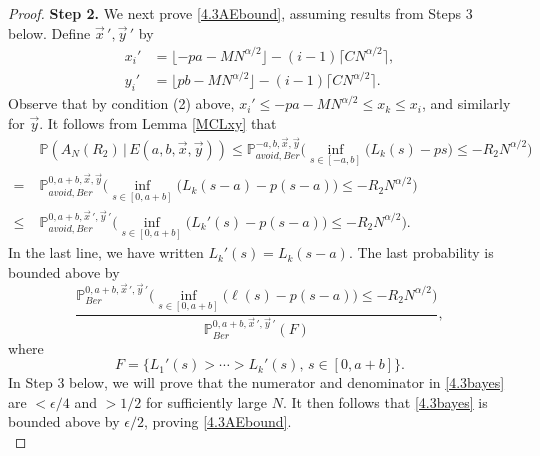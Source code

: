 \begin{proof}
		\noindent\textbf{Step 2.} We next prove \eqref{4.3AEbound}, assuming results from Steps 3 below. Define $\vec{x}\,',\vec{y}\,'$ by
		\begin{align*}
		x_i' &= \lfloor - pa - MN^{\alpha/2}\rfloor - (i-1)\lceil CN^{\alpha/2}\rceil,\\
		y_i' &= \lfloor pb - MN^{\alpha/2}\rfloor - (i-1)\lceil CN^{\alpha/2}\rceil.
		\end{align*}  
		Observe that by condition (2) above, $x_i'\leq -pa - MN^{\alpha/2} \leq x_k \leq x_i$, and similarly for $\vec{y}$. It follows from Lemma \ref{MCLxy} that
		\begin{align}
		&\mathbb{P}(A_N(R_2)\,|\,E(a,b,\vec{x},\vec{y})) \leq \mathbb{P}^{-a,b, \vec{x}, \vec{y}}_{avoid, Ber} \Big( \inf_{s\in[-a, b]} \big(L_k(s) - ps\big) \leq -R_2N^{\alpha/2} \Big) \label{4.3main}\\
		= \; & \mathbb{P}^{0, a+b, \vec{x}, \vec{y}}_{avoid, Ber} \Big( \inf_{s\in[0,a+b]} \big(L_k(s-a) - p(s-a)\big) \leq -R_2N^{\alpha/2} \Big) \nonumber\\
		\leq \; & \mathbb{P}^{0, a+b, \vec{x}\,', \vec{y}\,'}_{avoid, Ber} \Big( \inf_{s\in[0,a+b]} \big(L_k'(s) - p(s-a)\big) \leq -R_2N^{\alpha/2} \Big) \nonumber.
		\end{align}
		In the last line, we have written $L_k'(s) = L_k(s-a)$. The last probability is bounded above by
		\begin{equation}\label{4.3bayes}
		\frac{\mathbb{P}^{0, a+b, \vec{x}\,', \vec{y}\,'}_{Ber} \Big( \inf_{s\in[0,a+b]} \big(\ell(s) - p(s-a)\big) \leq -R_2 N^{\alpha/2} \Big)}{\mathbb{P}^{0, a+b, \vec{x}\,', \vec{y}\,'}_{Ber}(F)},
		\end{equation}
		where
		\[
		F = \{L_1'(s) > \cdots > L_k'(s), \,s\in [0, a+b]\}.
		\]
		In Step 3 below, we will prove that the numerator and denominator in \eqref{4.3bayes} are $<\epsilon/4$ and $>1/2$ for sufficiently large $N$. It then follows that \eqref{4.3bayes} is bounded above by $\epsilon/2$, proving \eqref{4.3AEbound}.\\
		

\end{proof}
